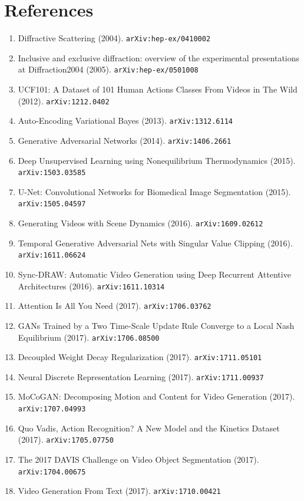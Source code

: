 \documentclass[11pt]{article}
\begin{document}
\section*{References}
\begin{enumerate}\small
  \item Diffractive Scattering (2004). \texttt{arXiv:hep-ex/0410002}
  \item Inclusive and exclusive diffraction: overview of the experimental
  presentations at Diffraction2004 (2005). \texttt{arXiv:hep-ex/0501008}
  \item UCF101: A Dataset of 101 Human Actions Classes From Videos in The Wild (2012). \texttt{arXiv:1212.0402}
  \item Auto-Encoding Variational Bayes (2013). \texttt{arXiv:1312.6114}
  \item Generative Adversarial Networks (2014). \texttt{arXiv:1406.2661}
  \item Deep Unsupervised Learning using Nonequilibrium Thermodynamics (2015). \texttt{arXiv:1503.03585}
  \item U-Net: Convolutional Networks for Biomedical Image Segmentation (2015). \texttt{arXiv:1505.04597}
  \item Generating Videos with Scene Dynamics (2016). \texttt{arXiv:1609.02612}
  \item Temporal Generative Adversarial Nets with Singular Value Clipping (2016). \texttt{arXiv:1611.06624}
  \item Sync-DRAW: Automatic Video Generation using Deep Recurrent Attentive
  Architectures (2016). \texttt{arXiv:1611.10314}
  \item Attention Is All You Need (2017). \texttt{arXiv:1706.03762}
  \item GANs Trained by a Two Time-Scale Update Rule Converge to a Local Nash
  Equilibrium (2017). \texttt{arXiv:1706.08500}
  \item Decoupled Weight Decay Regularization (2017). \texttt{arXiv:1711.05101}
  \item Neural Discrete Representation Learning (2017). \texttt{arXiv:1711.00937}
  \item MoCoGAN: Decomposing Motion and Content for Video Generation (2017). \texttt{arXiv:1707.04993}
  \item Quo Vadis, Action Recognition? A New Model and the Kinetics Dataset (2017). \texttt{arXiv:1705.07750}
  \item The 2017 DAVIS Challenge on Video Object Segmentation (2017). \texttt{arXiv:1704.00675}
  \item Video Generation From Text (2017). \texttt{arXiv:1710.00421}

\end{enumerate}
\end{document}
